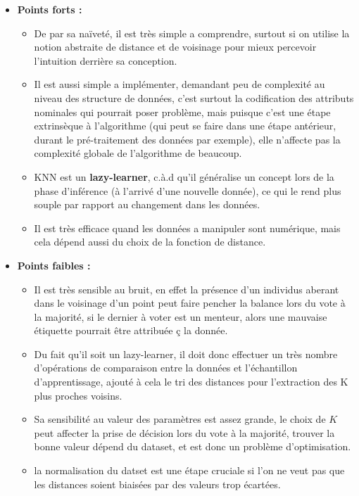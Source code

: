 \documentclass[12pt]{report}
\begin{document}
			\begin{itemize}
				\item \textbf{Points forts :}
				\begin{itemize}
					\item De par sa naïveté, il est très simple a comprendre, surtout si on utilise la notion abstraite de distance et de voisinage pour mieux percevoir l'intuition derrière sa conception.
					\item Il est aussi simple a implémenter, demandant peu de complexité au niveau des structure de données, c'est surtout la codification des attributs nominales qui pourrait poser problème, mais puisque c'est une étape extrinsèque à l'algorithme (qui peut se faire dans une étape antérieur, durant le pré-traitement des données par exemple), elle n'affecte pas la complexité globale de l'algorithme de beaucoup.
					\item KNN est un \textbf{lazy-learner}, c.à.d qu'il généralise un concept lors de la phase d'inférence (à l'arrivé d'une nouvelle donnée), ce qui le rend plus souple par rapport au changement dans les données.
					\item Il est très efficace quand les données a manipuler sont numérique, mais cela dépend aussi du choix de la fonction de distance.
					  
				\end{itemize}
				\item \textbf{Points faibles :}
				\begin{itemize}
					\item Il est très sensible au bruit, en effet la présence d'un individus aberant dans le voisinage d'un point peut faire pencher la balance lors du vote à la majorité, si le dernier à voter est un menteur, alors une mauvaise étiquette pourrait être attribuée ç la donnée.
					\item Du fait qu'il soit un lazy-learner, il doit donc effectuer un très nombre d'opérations de comparaison entre la données et l'échantillon d'apprentissage, ajouté à cela le tri des distances pour l'extraction des K plus proches voisins.
					\item Sa sensibilité au valeur des paramètres est assez grande, le choix de $K$ peut affecter la prise de décision lors du vote à la majorité, trouver la bonne valeur dépend du dataset, et est donc un problème d'optimisation.
					\item la normalisation du datset est une étape cruciale si l'on ne veut pas que les distances soient biaisées par des valeurs trop écartées.
				\end{itemize}
			\end{itemize}
\end{document}
